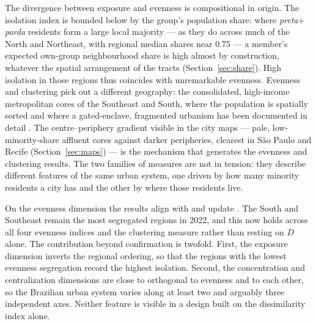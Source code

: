 \documentclass[pdflatex,sn-basic]{sn-jnl}%
\begin{document}
The divergence between exposure and evenness is compositional in origin. The isolation index is bounded below by the group's population share: where \emph{preta}$+$\emph{parda} residents form a large local majority --- as they do across much of the North and Northeast, with regional median shares near 0.75 --- a member's expected own-group neighbourhood share is high almost by construction, whatever the spatial arrangement of the tracts (Section~\ref{sec:share}). High isolation in those regions thus coincides with unremarkable evenness. Evenness and clustering pick out a different geography: the consolidated, high-income metropolitan cores of the Southeast and South, where the population is spatially sorted and where a gated-enclave, fragmented urbanism has been documented in detail \citep{barros2024saopaulolondres, danilofranca2022fortaleza, telles2004race}. The centre--periphery gradient visible in the city maps --- pale, low-minority-share affluent cores against darker peripheries, clearest in S\~ao Paulo and Recife (Section~\ref{sec:maps}) --- is the mechanism that generates the evenness and clustering results. The two families of measures are not in tension: they describe different features of the same urban system, one driven by how many minority residents a city has and the other by where those residents live.

On the evenness dimension the results align with and update \citet{deSouza2023nationwide_english}. The South and Southeast remain the most segregated regions in 2022, and this now holds across all four evenness indices and the clustering measure rather than resting on $D$ alone. The contribution beyond confirmation is twofold. First, the exposure dimension inverts the regional ordering, so that the regions with the lowest evenness segregation record the highest isolation. Second, the concentration and centralization dimensions are close to orthogonal to evenness and to each other, so the Brazilian urban system varies along at least two and arguably three independent axes. Neither feature is visible in a design built on the dissimilarity index alone.
\end{document}
